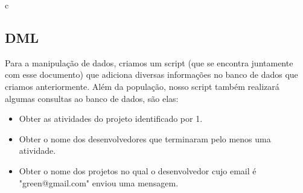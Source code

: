 c\documentclass{article}
\begin{document}
	\subsection{DML}
		Para a manipulação de dados, criamos um script (que se encontra juntamente com esse documento) que adiciona diversas informações no banco de dados que criamos anteriormente. Além da população, nosso script também realizará algumas consultas ao banco de dados, são elas:
		\begin{itemize}
			\item Obter as atividades do projeto identificado por 1.\\

			\item Obter o nome dos desenvolvedores que terminaram pelo menos uma atividade.\\

			\item Obter o nome dos projetos no qual o desenvolvedor cujo email é "green@gmail.com" enviou uma mensagem.\\

		\end{itemize}
\end{document}
